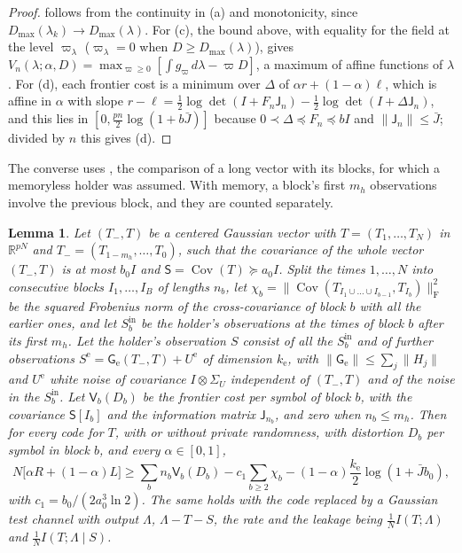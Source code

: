 \documentclass[11pt,onecolumn]{IEEEtran}
\newtheorem{lemma}[theorem]{Lemma}
\newcommand{\R}{\mathbb{R}}
\newcommand{\Cov}{\operatorname{Cov}}
\begin{document}
\begin{proof}
follows from the continuity in (a) and monotonicity, since
$D_{\max}(\lambda_k)\to D_{\max}(\lambda)$. For (c), the bound above, with
equality for the field at the level $\varpi_\lambda$ ($\varpi_\lambda=0$ when
$D\ge D_{\max}(\lambda)$), gives
$V_n(\lambda;\alpha,D)=\max_{\varpi\ge0}[\int g_\varpi\,d\lambda-\varpi D]$, a maximum
of affine functions of $\lambda$. For (d), each frontier cost is a minimum
over $\Delta$ of $\alpha r+(1-\alpha)\ell$, which is affine in $\alpha$ with
slope
$r-\ell=\tfrac12\log\det(I+F_n\mathsf J_n)-\tfrac12\log\det(I+\Delta\mathsf J_n)$,
and this lies in $[0,\tfrac{pn}2\log(1+b\bar J)]$ because
$0\prec\Delta\preceq F_n\preceq bI$ and $\|\mathsf J_n\|\le\bar J$; divided by $n$
this gives (d).
\end{proof}

The converse uses \cite[Lemma~10]{part3}, the comparison of a long
vector with its blocks, for which a memoryless holder was assumed. With
memory, a block's first $m_h$ observations involve the previous block,
and they are counted separately.

\begin{lemma}\label{lem:blocksmemory}
Let $(T_-,T)$ be a centered Gaussian vector with $T=(T_1,\dots,T_N)$ in
$\R^{pN}$ and $T_-=(T_{1-m_h},\dots,T_0)$, such that the covariance of the
whole vector $(T_-,T)$ is at most $b_0I$ and $\mathsf S=\Cov(T)\succeq a_0I$.
Split the times $1,\dots,N$ into consecutive blocks $I_1,\dots,I_B$ of
lengths $n_b$, let
$\chi_b=\|\Cov(T_{I_1\cup\dots\cup I_{b-1}},T_{I_b})\|_{\mathrm F}^2$ be the
squared Frobenius norm of the cross-covariance of block $b$ with all the
earlier ones, and let $S^{\mathrm{in}}_b$ be the holder's
observations at the times of block $b$ after its first $m_h$. Let the
holder's observation $S$ consist of all the $S^{\mathrm{in}}_b$ and of
further observations $S^{\mathrm e}=\mathsf G_{\mathrm e}(T_-,T)+U^{\mathrm e}$
of dimension $k_{\mathrm e}$, with $\|\mathsf G_{\mathrm e}\|\le\sum_j\|H_j\|$ and
$U^{\mathrm e}$ white noise of covariance $I\otimes\Sigma_U$ independent of
$(T_-,T)$ and of the noise in the $S^{\mathrm{in}}_b$. Let $\mathsf V_b(D_b)$ be
the frontier cost per symbol of block $b$, with the covariance
$\mathsf S[I_b]$ and the information matrix $\mathsf J_{n_b}$, and zero when
$n_b\le m_h$. Then for every code for $T$, with or without private
randomness, with distortion $D_b$ per symbol in block $b$, and every
$\alpha\in[0,1]$,
\[
N\bigl[\alpha R+(1-\alpha)L\bigr]\ge\sum_bn_b\mathsf V_b(D_b)-c_1\sum_{b\ge2}\chi_b-(1-\alpha)\frac{k_{\mathrm e}}2\log(1+\bar Jb_0),
\]
with $c_1=b_0/(2a_0^3\ln2)$. The same holds with the code replaced by a
Gaussian test channel with output $\Lambda$, $\Lambda-T-S$, the rate and
the leakage being $\tfrac1NI(T;\Lambda)$ and $\tfrac1NI(T;\Lambda\mid S)$.
\end{lemma}
\end{document}
